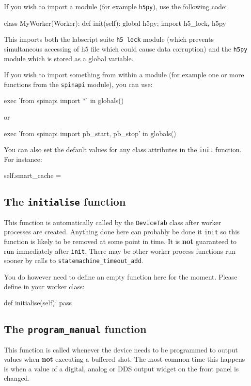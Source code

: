 \documentclass[12pt]{article}
\begin{document}
If you wish to import a module (for example \texttt{h5py}), use the following code:
\begin{python}
class MyWorker(Worker):
    def init(self):
        global h5py; import h5_lock, h5py
\end{python}
This imports both the labscript suite \texttt{h5\_lock} module (which prevents simultaneous accessing of h5 file which could cause data corruption) and the \texttt{h5py} module which is stored as a global variable.

If you wish to import something from within a module (for example one or more functions from the \texttt{spinapi} module), you can use:
\begin{python}
        exec 'from spinapi import *' in globals()
\end{python}
or
\begin{python}
        exec 'from spinapi import pb_start, pb_stop' in globals()
\end{python}

You can also set the default values for any class attributes in the \texttt{init} function. For instance:
\begin{python}
        self.smart_cache = {}
\end{python}

\subsection{The \texttt{initialise} function}
This function is automatically called by the \texttt{DeviceTab} class after worker processes are created. 
Anything done here can probably be done it \texttt{init} so this function is likely to be removed at some point in time.
It is \textbf{not} guaranteed to run immediately after \texttt{init}.
There may be other worker process functions run sooner by calls to \texttt{statemachine\_timeout\_add}.

You do however need to define an empty function here for the moment.
Please define in your worker class:
\begin{python}
    def initialise(self):
        pass
\end{python}


\subsection{The \texttt{program\_manual} function}
This function is called whenever the device needs to be programmed to output values when \textbf{not} executing a buffered shot.
The most common time this happens is when a value of a digital, analog or DDS output widget on the front panel is changed.
\end{document}
